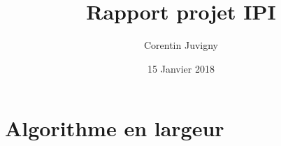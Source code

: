 \documentclass[a4paper, 11pt]{report}
\title{Rapport projet IPI}
\author{Corentin Juvigny}
\date{15 Janvier 2018}
\newenvironment{adjustwidth}[2]{
 \begin{list}{}{
  \setlength{\parsep}{\parskip}
  \setlength{\labelsep}{0em}
  \setlength{\listparindent}{\parindent}
  \setlength{\labelwidth}{0em}
 }
 \item
}{\end{list}}
\begin{document}
\setlength{\topmargin}{0pt} %
\setlength{\headheight}{13pt} %
\setlength{\headsep}{10pt} %
\newcommand{\HRule}{\rule{\linewidth}{0.5mm}}
\newenvironment{indented}[1][1.5cm]{\begin{adjustwidth}{#1}{0cm}}{\end{adjustwidth}}
\maketitle

\cfoot{\thepage}
\setcounter{page}{2}
\section{Algorithme en largeur}
\end{document}
